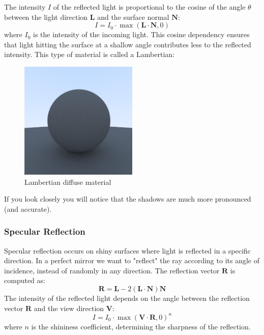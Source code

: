 \documentclass[12pt]{article}
\begin{document}
The intensity \(I\) of the reflected light is proportional to the cosine of the angle \(\theta\) between the light direction \(\mathbf{L}\) and the surface normal \(\mathbf{N}\):
\[
    I = I_0 \cdot \max(\mathbf{L} \cdot \mathbf{N}, 0)
\]
where \(I_0\) is the intensity of the incoming light. This cosine dependency ensures that light hitting the surface at a shallow angle contributes less to the reflected intensity.
This type of material is called a Lambertian:

\begin{figure}[H]
    \centering
    \includegraphics[width=0.5\textwidth]{images/lambertian/lambertian_diffuse.png}
    \caption{Lambertian diffuse material}
    \label{fig:lambdiffmat}
\end{figure}

If you look closely you will notice that the shadows are much more pronounced (and accurate).

\subsubsection{Specular Reflection}
Specular reflection occurs on shiny surfaces where light is reflected in a specific direction. In a perfect mirror we want to "reflect" the ray according to its angle of incidence, instead of randomly in any direction.
The reflection vector \(\mathbf{R}\) is computed as:
\[
    \mathbf{R} = \mathbf{L} - 2(\mathbf{L} \cdot \mathbf{N})\mathbf{N}
\]
The intensity of the reflected light depends on the angle between the reflection vector \(\mathbf{R}\) and the view direction \(\mathbf{V}\):
\[
    I = I_0 \cdot \max(\mathbf{V} \cdot \mathbf{R}, 0)^n
\]
where \(n\) is the shininess coefficient, determining the sharpness of the reflection.
\end{document}
